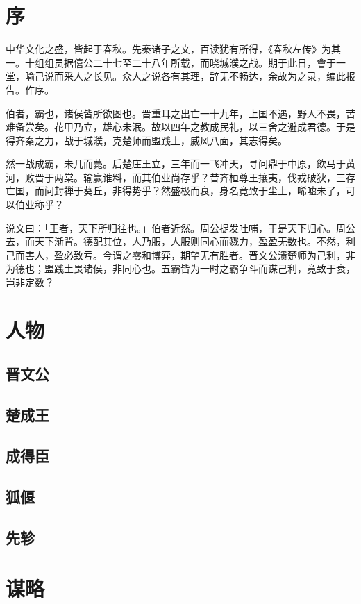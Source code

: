 \documentclass{article}
\date{}
\begin{document}
\makecover
\tableofcontents

\section{序}

中华文化之盛，皆起于春秋。先秦诸子之文，百读犹有所得，《春秋左传》为其一。十组组员据僖公二十七至二十八年所载，而晓城濮之战。期于此日，會于一堂，喻己说而采人之长见。众人之说各有其理，辞无不畅达，余故为之录，编此报告。作序。

伯者，霸也，诸侯皆所欲图也。晋重耳之出亡一十九年，上国不遇，野人不畏，苦难备尝矣。花甲乃立，雄心未泯。故以四年之教成民礼，以三舍之避成君德。于是得齐秦之力，战于城濮，克楚师而盟践土，威风八面，其志得矣。

然一战成霸，未几而薨。后楚庄王立，三年而一飞冲天，寻问鼎于中原，飲马于黄河，败晋于两棠。输赢谁料，而其伯业尚存乎？昔齐桓尊王攘夷，伐戎破狄，三存亡国，而问封禅于葵丘，非得势乎？然盛极而衰，身名竟致于尘土，唏嘘未了，可以伯业称乎？

说文曰：「王者，天下所归往也。」伯者近然。周公捉发吐哺，于是天下归心。周公去，而天下渐背。德配其位，人乃服，人服则同心而戮力，盈盈无数也。不然，利己而害人，盈必致亏。今谓之零和博弈，期望无有胜者。晋文公溃楚师为己利，非为德也；盟践土畏诸侯，非同心也。五霸皆为一时之霸争斗而谋己利，竟致于衰，岂非定数？

\section{人物}

\subsection{晋文公}

\subsection{楚成王}

\subsection{成得臣}

\subsection{狐偃}

\subsection{先轸}

\section{谋略}
\end{document}
